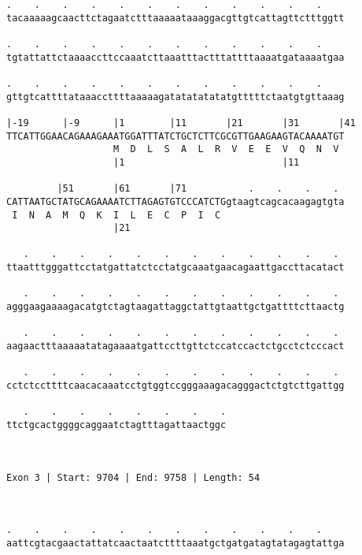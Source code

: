 \documentclass{article}
\begin{document}
\begin{Verbatim}
.    .    .    .    .    .    .    .    .    .    .    .    
tacaaaaagcaacttctagaatctttaaaaataaaggacgttgtcattagttctttggtt
                                                            
.    .    .    .    .    .    .    .    .    .    .    .    
tgtattattctaaaaccttccaaatcttaaatttactttattttaaaatgataaaatgaa
                                                            
.    .    .    .    .    .    .    .    .    .    .    .    
gttgtcattttataaaccttttaaaaagatatatatatatgtttttctaatgtgttaaag
                                                            
|-19      |-9      |1        |11       |21       |31       |41
TTCATTGGAACAGAAAGAAATGGATTTATCTGCTCTTCGCGTTGAAGAAGTACAAAATGT
                   M  D  L  S  A  L  R  V  E  E  V  Q  N  V 
                   |1                            |11        
  
         |51       |61       |71           .    .    .    . 
CATTAATGCTATGCAGAAAATCTTAGAGTGTCCCATCTGgtaagtcagcacaagagtgta
 I  N  A  M  Q  K  I  L  E  C  P  I  C                      
                   |21                                      
  
   .    .    .    .    .    .    .    .    .    .    .    . 
ttaatttgggattcctatgattatctcctatgcaaatgaacagaattgaccttacatact
                                                            
   .    .    .    .    .    .    .    .    .    .    .    . 
agggaagaaaagacatgtctagtaagattaggctattgtaattgctgattttcttaactg
                                                            
   .    .    .    .    .    .    .    .    .    .    .    . 
aagaactttaaaaatatagaaaatgattccttgttctccatccactctgcctctcccact
                                                            
   .    .    .    .    .    .    .    .    .    .    .    . 
cctctccttttcaacacaaatcctgtggtccgggaaagacagggactctgtcttgattgg
                                                            
   .    .    .    .    .    .    .    .
ttctgcactggggcaggaatctagtttagattaactggc
                                       
                                       
 
Exon 3 | Start: 9704 | End: 9758 | Length: 54



.    .    .    .    .    .    .    .    .    .    .    .    
aattcgtacgaactattatcaactaatcttttaaatgctgatgatagtatagagtattga
                                                            

\end{Verbatim}
\end{document}
